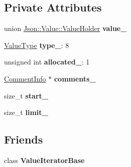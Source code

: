 \subsection*{Private Attributes}
\begin{DoxyCompactItemize}
\item 
\hypertarget{class_json_1_1_value_aef578244546212705b9f81eb84d7e151}{}union \hyperlink{union_json_1_1_value_1_1_value_holder}{Json\+::\+Value\+::\+Value\+Holder} {\bfseries value\+\_\+}\label{class_json_1_1_value_aef578244546212705b9f81eb84d7e151}

\item 
\hypertarget{class_json_1_1_value_abd222c2536dc88bf330dedcd076d2356}{}\hyperlink{namespace_json_a7d654b75c16a57007925868e38212b4e}{Value\+Type} {\bfseries type\+\_\+}\+: 8\label{class_json_1_1_value_abd222c2536dc88bf330dedcd076d2356}

\item 
\hypertarget{class_json_1_1_value_ae0126c80dc4907aad94088553fc7632b}{}unsigned int {\bfseries allocated\+\_\+}\+: 1\label{class_json_1_1_value_ae0126c80dc4907aad94088553fc7632b}

\item 
\hypertarget{class_json_1_1_value_a2016564cabc7a29208e97bd0b782a4e4}{}\hyperlink{struct_json_1_1_value_1_1_comment_info}{Comment\+Info} $\ast$ {\bfseries comments\+\_\+}\label{class_json_1_1_value_a2016564cabc7a29208e97bd0b782a4e4}

\item 
\hypertarget{class_json_1_1_value_a810637b8c52661a3dbf4bfde5130d6d1}{}size\+\_\+t {\bfseries start\+\_\+}\label{class_json_1_1_value_a810637b8c52661a3dbf4bfde5130d6d1}

\item 
\hypertarget{class_json_1_1_value_acbec44708b0d4dbec2db6d8428955dbb}{}size\+\_\+t {\bfseries limit\+\_\+}\label{class_json_1_1_value_acbec44708b0d4dbec2db6d8428955dbb}

\end{DoxyCompactItemize}
\subsection*{Friends}
\begin{DoxyCompactItemize}
\item 
\hypertarget{class_json_1_1_value_ad016df56489e5d360735457afba2f649}{}class {\bfseries Value\+Iterator\+Base}\label{class_json_1_1_value_ad016df56489e5d360735457afba2f649}

\end{DoxyCompactItemize}


